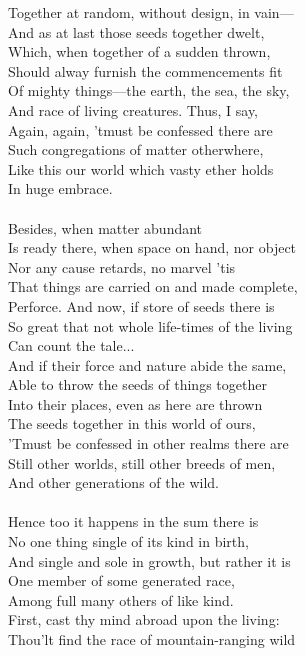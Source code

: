 Together at random, without design, in vain—\\
And as at last those seeds together dwelt,\\
Which, when together of a sudden thrown,\\
Should alway furnish the commencements fit\\
Of mighty things—the earth, the sea, the sky,\\
And race of living creatures. Thus, I say,\\
Again, again, 'tmust be confessed there are\\
Such congregations of matter otherwhere,\\
Like this our world which vasty ether holds\\
In huge embrace.\\
\\
Besides, when matter abundant\\
Is ready there, when space on hand, nor object\\
Nor any cause retards, no marvel 'tis\\
That things are carried on and made complete,\\
Perforce. And now, if store of seeds there is\\
So great that not whole life-times of the living\\
Can count the tale...\\
And if their force and nature abide the same,\\
Able to throw the seeds of things together\\
Into their places, even as here are thrown\\
The seeds together in this world of ours,\\
'Tmust be confessed in other realms there are\\
Still other worlds, still other breeds of men,\\
And other generations of the wild.\\
\\
Hence too it happens in the sum there is\\
No one thing single of its kind in birth,\\
And single and sole in growth, but rather it is\\
One member of some generated race,\\
Among full many others of like kind.\\
First, cast thy mind abroad upon the living:\\
Thou'lt find the race of mountain-ranging wild\\
